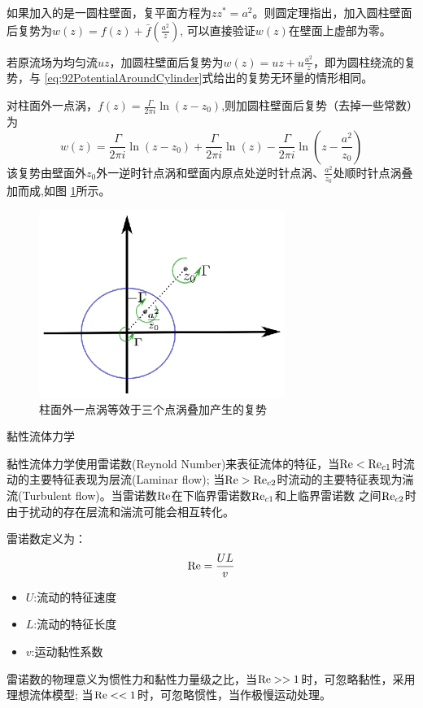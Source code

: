如果加入的是一圆柱壁面，复平面方程为$zz^*=a^2$。则圆定理指出，加入圆柱壁面后复势为$w(z)=f(z)+\bar{f}(\frac{a^2}{z})$,
可以直接验证$w(z)$在壁面上虚部为零。

若原流场为均匀流$uz$，加圆柱壁面后复势为$w(z)=uz+u\frac{a^2}{z}$，即为圆柱绕流的复势，与
\eqref{eq:92PotentialAroundCylinder}式给出的复势无环量的情形相同。

对柱面外一点涡，$f(z)=\frac{\Gamma}{2\pi i}\ln(z-z_0)$,则加圆柱壁面后复势（去掉一些常数）为
\begin{equation}
w(z)=\frac{\Gamma}{2\pi i}\ln(z-z_0)+\frac{\Gamma}{2\pi i}\ln(z)-\frac{\Gamma}{2\pi i}\ln(z-\frac{a^2}{z_0})
\end{equation}
该复势由壁面外$z_0$外一逆时针点涡和壁面内原点处逆时针点涡、$\frac{a^2}{z_0}$处顺时针点涡叠加而成,如图
\ref{fig:pointVortexImage}所示。
\begin{figure}[!ht]
 \centering
 \includegraphics[width=8cm]{pointVortexImage.eps}
 \caption{柱面外一点涡等效于三个点涡叠加产生的复势}\label{fig:pointVortexImage}
\end{figure}

黏性流体力学

黏性流体力学使用雷诺数(Reynold Number)来表征流体的特征，当$\operatorname{Re}<\operatorname{Re}_{c1}$时流动的主要特征表现为层流(Laminar flow);
当$\operatorname{Re}>\operatorname{Re}_{c2}$时流动的主要特征表现为湍流(Turbulent flow)。当雷诺数$\operatorname{Re}$在下临界雷诺数$\operatorname{Re}_{c1}$和上临界雷诺数
之间$\operatorname{Re}_{c2}$时由于扰动的存在层流和湍流可能会相互转化。

雷诺数定义为：
\begin{equation}
\operatorname{Re}=\frac{UL}{v}
\end{equation}
\begin{itemize}
\item $U$:流动的特征速度
\item $L$:流动的特征长度
\item $v$:运动黏性系数
\end{itemize}

雷诺数的物理意义为惯性力和黏性力量级之比，当$\operatorname{Re} >>1$时，可忽略黏性，采用理想流体模型;
当$\operatorname{Re} <<1 $时，可忽略惯性，当作极慢运动处理。
